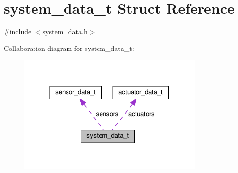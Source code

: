\hypertarget{structsystem__data__t}{}\section{system\+\_\+data\+\_\+t Struct Reference}
\label{structsystem__data__t}


{\ttfamily \#include $<$system\+\_\+data.\+h$>$}



Collaboration diagram for system\+\_\+data\+\_\+t\+:\nopagebreak
\begin{figure}[H]
\begin{center}
\leavevmode
\includegraphics[width=260pt]{structsystem__data__t__coll__graph}
\end{center}
\end{figure}
